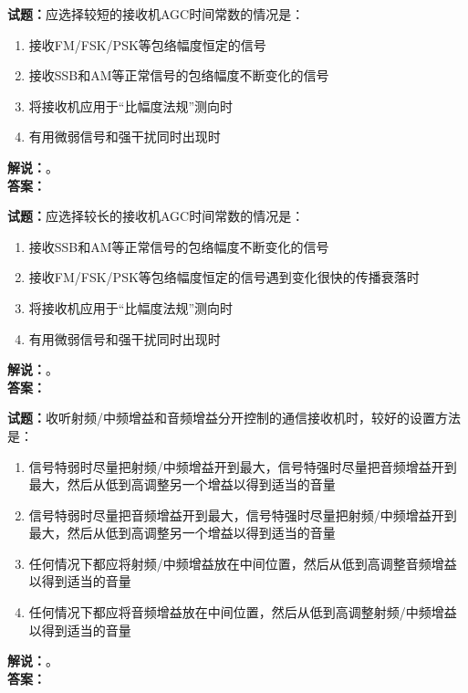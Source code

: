 \documentclass{ctexbook}
\begin{document}
\bigskip




\noindent\textbf{试题：}应选择较短的接收机AGC时间常数的情况是：
\begin{enumerate}[leftmargin=3em]
\item 接收FM/FSK/PSK等包络幅度恒定的信号
\item 接收SSB和AM等正常信号的包络幅度不断变化的信号
\item 将接收机应用于“比幅度法规”测向时
\item 有用微弱信号和强干扰同时出现时
\end{enumerate}
\noindent\textbf{解说：}\textbf{}。\\\noindent\textbf{答案：}

\bigskip




\noindent\textbf{试题：}应选择较长的接收机AGC时间常数的情况是：
\begin{enumerate}[leftmargin=3em]
\item 接收SSB和AM等正常信号的包络幅度不断变化的信号
\item 接收FM/FSK/PSK等包络幅度恒定的信号遇到变化很快的传播衰落时
\item 将接收机应用于“比幅度法规”测向时
\item 有用微弱信号和强干扰同时出现时
\end{enumerate}
\noindent\textbf{解说：}\textbf{}。\\\noindent\textbf{答案：}

\bigskip




\noindent\textbf{试题：}收听射频/中频增益和音频增益分开控制的通信接收机时，较好的设置方法是：
\begin{enumerate}[leftmargin=3em]
\item 信号特弱时尽量把射频/中频增益开到最大，信号特强时尽量把音频增益开到最大，然后从低到高调整另一个增益以得到适当的音量
\item 信号特弱时尽量把音频增益开到最大，信号特强时尽量把射频/中频增益开到最大，然后从低到高调整另一个增益以得到适当的音量
\item 任何情况下都应将射频/中频增益放在中间位置，然后从低到高调整音频增益以得到适当的音量
\item 任何情况下都应将音频增益放在中间位置，然后从低到高调整射频/中频增益以得到适当的音量
\end{enumerate}
\noindent\textbf{解说：}\textbf{}。\\\noindent\textbf{答案：}

\bigskip
\end{document}
